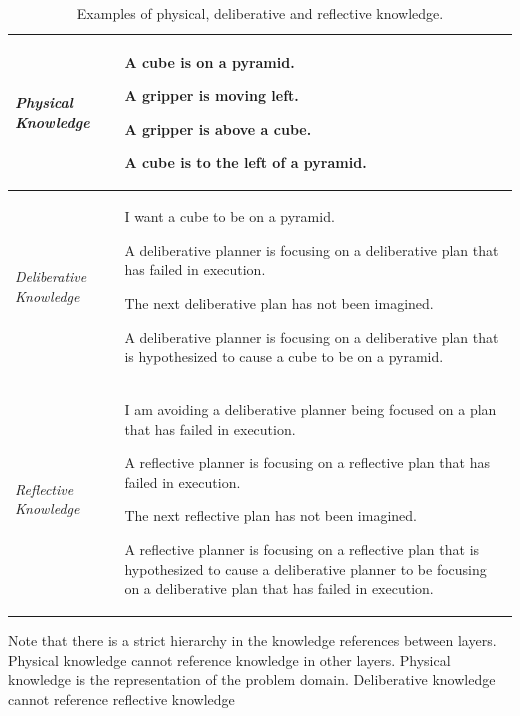 \begin{table}
\centering
\begin{tabular}{|p{2cm}|p{8cm}|}
\hline \emph{Physical Knowledge} & \begin{packed_itemize}
\item{A cube is on a pyramid.}
\item{A gripper is moving left.}
\item{A gripper is above a cube.}
\item{A cube is to the left of a pyramid.}
\end{packed_itemize} \\
\hline \emph{Deliberative Knowledge} & \begin{packed_itemize}
\item{I want a cube to be on a pyramid.}
\item{A deliberative planner is focusing on a deliberative plan that
  has failed in execution.}
\item{The next deliberative plan has not been imagined.}
\item{A deliberative planner is focusing on a deliberative plan that
  is hypothesized to cause a cube to be on a pyramid.}
\end{packed_itemize} \\
\hline \emph{Reflective Knowledge}   & \begin{packed_itemize}
\item{I am avoiding a deliberative planner being focused on a plan
  that has failed in execution.}
\item{A reflective planner is focusing on a reflective plan that has
  failed in execution.}
\item{The next reflective plan has not been imagined.}
\item{A reflective planner is focusing on a reflective plan that is
  hypothesized to cause a deliberative planner to be focusing on a
  deliberative plan that has failed in execution.}
\end{packed_itemize} \\
\hline
\end{tabular}
\caption{Examples of physical, deliberative and reflective knowledge.}
\label{table:physical_deliberative_reflective_knowledge}
\end{table}
Note that there is a strict hierarchy in the knowledge references
between layers.  Physical knowledge cannot reference knowledge in
other layers.  Physical knowledge is the representation of the problem
domain.  Deliberative knowledge cannot reference reflective knowledge
